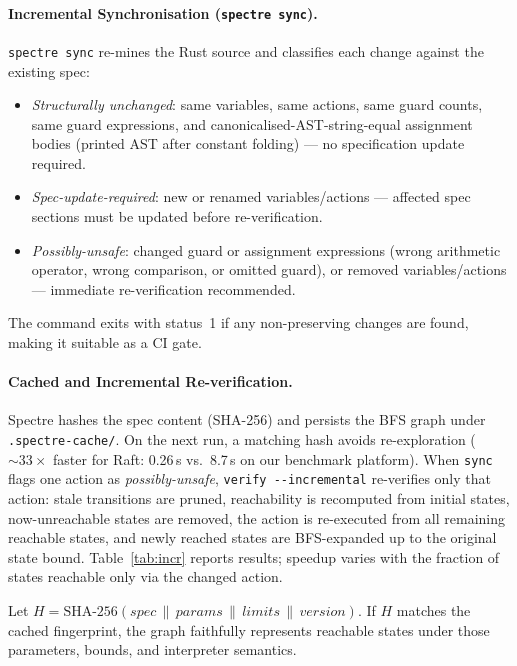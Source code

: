 \documentclass[runningheads]{llncs}
\begin{document}
\paragraph{Incremental Synchronisation (\texttt{spectre sync}).}
\texttt{spectre sync} re-mines the Rust source and classifies each
change against the existing spec:
\begin{itemize}
  \item \emph{Structurally unchanged}: same variables, same actions, same guard
    counts, same guard expressions, and canonicalised-AST-string-equal assignment bodies
    (printed AST after constant folding) --- no specification update required.
  \item \emph{Spec-update-required}: new or renamed variables/actions ---
    affected spec sections must be updated before re-verification.
  \item \emph{Possibly-unsafe}: changed guard or assignment expressions
    (wrong arithmetic operator, wrong comparison, or omitted guard),
    or removed variables/actions --- immediate re-verification recommended.
\end{itemize}
The command exits with status~1 if any non-preserving changes are found,
making it suitable as a CI gate.

\paragraph{Cached and Incremental Re-verification.}
Spectre hashes the spec content (SHA-256) and persists the BFS graph under
\texttt{.spectre-cache/}.  On the next run, a matching hash avoids re-exploration
(${\sim}33\times$ faster for Raft: 0.26\,s vs.\ 8.7\,s on our benchmark platform).
When \texttt{sync} flags one action as \emph{possibly-unsafe},
\texttt{verify~-{}-incremental} re-verifies only that action:
stale transitions are pruned, reachability is recomputed from initial states,
now-unreachable states are removed, the action is re-executed from all remaining
reachable states, and newly reached states are BFS-expanded up to the original
state bound. Table~\ref{tab:incr} reports results; speedup varies with the
fraction of states reachable only via the changed action.

\begin{proposition}\label{prop:cache}
Let $H = \mathrm{SHA\text{-}256}(\mathit{spec} \,\|\, \mathit{params} \,\|\,
\mathit{limits} \,\|\, \mathit{version})$.
If $H$ matches the cached fingerprint, the graph faithfully represents
reachable states under those parameters, bounds, and interpreter semantics.
\end{proposition}
\end{document}
